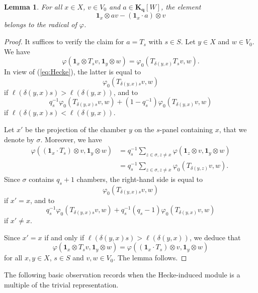 \documentclass[12pt,a4paper]{amsproc}
\newtheorem{lemma}[theorem]{Lemma}
\theoremstyle{definition}
\newcommand{\KK}{\mathbf K}
\newcommand{\one}{\mathbf 1}
\newcommand{\qq}{\mathbf q}
\begin{document}
\begin{lemma}\label{lem:induced-form}
For all $x \in X$, $v \in V_0$  and $a \in \KK_\qq[W]$, the element 
$$\one_x  \otimes a v - (\one_x \cdot a)\otimes  v  $$ 
belongs to the radical of $\varphi$. 
\end{lemma}
\begin{proof}
It suffices to verify the claim for $a=T_s$ with $s \in S$. Let $y \in X$ and $w \in V_0$. We have
$$
\varphi(\one_x \otimes T_s v, \one_y\otimes w) = \varphi_0(T_{\delta(y, x)} T_s v, w).$$
In view of (\ref{eq:Hecke}), 
the latter is equal to 
$$ \varphi_0(T_{\delta(y, x) s} v, w) $$
 if $\ell(\delta(y, x)s) > \ell(\delta(y, x)) $, and to 
$$ q_s^{-1} \varphi_0(T_{\delta(y, x) s} v, w)+(1-q_s^{-1})\varphi_0(T_{\delta(y, x)}v, w)$$
if   $\ell(\delta(y, x)s) < \ell(\delta(y, x))$. 

Let $x' $ be the projection of the chamber $y$ on the $s$-panel containing $x$, that we denote by $\sigma$. Moreover, we have
\begin{align*}
\varphi((\one_x \cdot T_s)\otimes   v, \one_y\otimes w) & = q_s^{-1}\sum_{z \in \sigma, z \neq x}\varphi(\one_z \otimes v, \one_y\otimes w)\\
&= q_s^{-1}\sum_{z \in \sigma, z \neq x}\varphi_0(T_{\delta(y, z)}v, w).
\end{align*}
Since $\sigma$ contains $q_s+ 1$ chambers, the right-hand side  is equal to 	
$$ \varphi_0(T_{\delta(y, x) s} v, w) $$
if $x' = x$, and to 
$$ q_s^{-1} \varphi_0(T_{\delta(y, x) s} v, w)+q_s^{-1}(q_s-1)\varphi_0(T_{\delta(y, x)}v, w)$$
if $x' \neq x$. 

Since $x' =x$ if and only if $\ell(\delta(y, x)s) > \ell(\delta(y, x)) $, we deduce  that 
$$\varphi(\one_x \otimes T_s v, \one_y\otimes w) = \varphi((\one_x \cdot T_s)\otimes   v, \one_y\otimes w)$$ 
for all $x, y \in X$, $s \in S$ and $v, w \in V_0$. The lemma follows. 
\end{proof}
		
The following basic observation records when the Hecke-induced module is a multiple of the trivial representation. 
\end{document}
